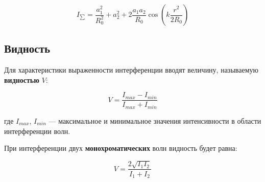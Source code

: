 \begin{equation*}
	I_{\sum} = \frac{a_1^2}{R_0^2} + a_2^2  + 2 \frac{a_1 a_2}{R_0} \cos \left(k \frac{r^2}{2 R_0}\right)
\end{equation*}

\subsection{Видность}

Для характеристики выраженности интерференции вводят величину, называемую \textbf{видностью} $V$:

\begin{equation}
	V = \frac{I_{max} - I_{min}}{I_{max} + I_{min}}
	\label{eq:Vidnost}
\end{equation}

где $I_{max}$, $I_{min}$ --- максимальное и минимальное значения интенсивности в области интерференции волн.

При интерференции двух \textbf{монохроматических} волн видность будет равна:

\begin{equation*}
	V = \frac{2 \sqrt{I_1 I_2}}{I_1 + I_2}
\end{equation*}